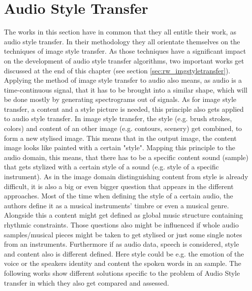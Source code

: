 \section{Audio Style Transfer}
\label{sec:rw_audio_style_transfer}
The works in this section have in common that they all entitle their work, as audio style transfer. In their methodology they all orientate themselves on the techniques of image style transfer. As those techniques have a significant impact on the development of audio style transfer algorithms, two important works get discussed at the end of this chapter (see section \ref{sec:rw_imgstyletransfer}). Applying the method of image style transfer to audio also means, as audio is a time-continuous signal, that it has to be brought into a similar shape, which will be done mostly by generating spectrograms out of signals. As for image style transfer, a content and a style picture is needed, this principle also gets applied to audio style transfer. In image style transfer, the style (e.g. brush strokes, colors) and content of an other image (e.g. contours, scenery) get combined, to form a new stylised image. \cite{Gatys2016} This means that in the output image, the content image looks like painted with a certain "style". Mapping this principle to the audio domain, this means, that there has to be a specific content sound (sample) that gets stylized with a certain style of a sound (e.g. style of a specific instrument). As in the image domain distinguishing content from style is already difficult, it is also a big or even bigger question that appears in the different approaches. Most of the time when defining the style of a certain audio, the authors define it as a musical instruments' timbre or even a musical genre. Alongside this a content might get defined as global music structure containing rhythmic constraints. \cite{Grinstein2018} Those questions also might be influenced if whole audio samples/musical pieces might be taken to get stylised or just some single notes from an instruments. Furthermore if as audio data, speech is considered, style and content also is different defined. Here style could be e.g. the emotion of the voice or the speakers identity and content the spoken words in an sample. The following works show different solutions specific to the problem of Audio Style transfer in which they also get compared and assessed. \\

